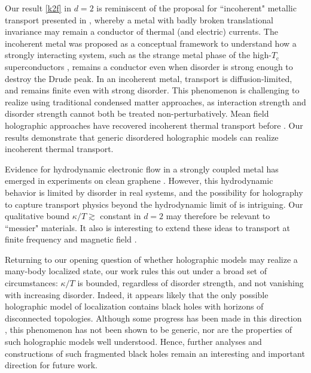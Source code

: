 \documentclass[10pt, oneside]{book}
\begin{document}
\begin{doublespace}
Our result \eqref{k2f} in $d=2$ is reminiscent of the proposal for ``incoherent" metallic transport presented in \cite{Hartnoll:2014lpa}, whereby a metal with badly broken translational invariance may remain a conductor of thermal (and electric) currents.   The incoherent metal was proposed as a conceptual framework to understand how a strongly interacting system, such as the strange metal phase of the high-$T_{\mathrm{c}}$ superconductors \cite{lt}, remains a conductor even when disorder is strong enough to destroy the Drude peak.  In an incoherent metal, transport is diffusion-limited, and remains finite even with strong disorder.   This phenomenon is challenging to realize using traditional condensed matter approaches, as interaction strength and disorder strength cannot both be treated non-perturbatively.    Mean field holographic approaches have recovered incoherent thermal transport before \cite{Davison:2014lua}.   Our results demonstrate that generic disordered holographic models can realize incoherent thermal transport.


Evidence for hydrodynamic electronic flow in a strongly coupled metal has emerged in experiments on clean graphene \cite{Crossno1058, Lucas:2015sya}.   However, this hydrodynamic behavior is limited by disorder in real systems, and the possibility for holography to capture transport physics beyond the hydrodynamic limit of \cite{Lucas:2015sya} is intriguing.   Our qualitative bound $\kappa/T\gtrsim$ constant in $d=2$ may therefore be relevant to ``messier" materials.  It also is interesting to extend these ideas to transport at finite frequency and magnetic field \cite{hkms, Lucas:2015pxa, Amoretti:2015gna, Blake:2015ina, Kim:2015wba,  Davison:2015bea, Blake:2015epa, Blake:2015hxa, Donos:2015bxe}.

Returning to our opening question of whether holographic models may realize a many-body localized state,  our work rules this out under a broad set of circumstances:  $\kappa/T$ is bounded, regardless of disorder strength, and not vanishing with increasing disorder.   Indeed, it appears likely that the only possible holographic model of localization contains black holes with horizons of disconnected topologies.   Although some progress has been made in this direction \cite{Anninos:2013mfa, Horowitz:2014gva, qi2015}, this phenomenon has not been shown to be generic, nor are the properties of such holographic models well understood. Hence, further analyses and constructions of such fragmented black holes remain an interesting and important direction for future work.


\end{doublespace}
\end{document}
